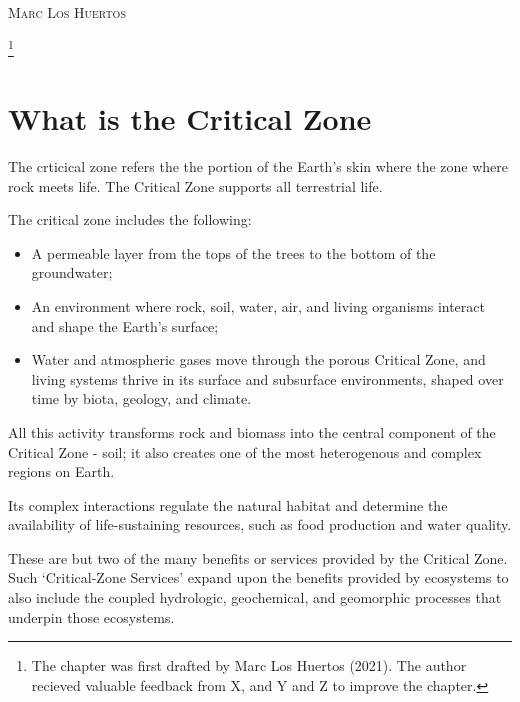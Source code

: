 \documentclass{book}\usepackage{knitr}
\makeatletter
\newcommand{\chapterauthor}[1]{%
  {\parindent0pt\vspace*{-25pt}%
  \linespread{1.1}\large\scshape#1%
  \par\nobreak\vspace*{35pt}}
  \@afterheading%
}
\makeatother
\begin{document}
\begin{knitrout}
\begin{kframe}
\chapterauthor{Marc Los Huertos}\footnote{The chapter was first drafted by Marc Los Huertos (2021). The author recieved valuable feedback from X, and Y and Z to improve the chapter.}

\section{What is the Critical Zone}

The crticical zone refers the the portion of the Earth's skin where the zone where rock meets life. The Critical Zone supports all terrestrial life.

The critical zone includes the following:

\begin{itemize}
  \item A permeable layer from the tops of the trees to the bottom of the groundwater;
  \item An environment where rock, soil, water, air, and living organisms interact and shape the Earth's surface;
  \item Water and atmospheric gases move through the porous Critical Zone, and living systems thrive in its surface and subsurface environments, shaped over time by biota, geology, and climate.
\end{itemize}

All this activity transforms rock and biomass into the central component of the Critical Zone - soil; it also creates one of the most heterogenous and complex regions on Earth.

Its complex interactions regulate the natural habitat and determine the availability of life-sustaining resources, such as food production and water quality.

These are but two of the many benefits or services provided by the Critical Zone. Such `Critical-Zone Services' expand upon the benefits provided by ecosystems to also include the coupled hydrologic, geochemical, and geomorphic processes that underpin those ecosystems.


\end{kframe}
\end{knitrout}
\end{document}
